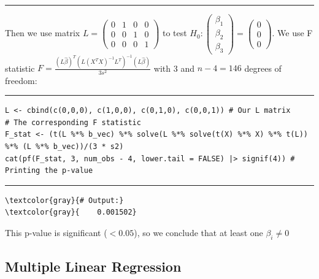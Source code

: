 \documentclass{article}
\begin{document}
\vspace{-15pt} %
\par\noindent\rule{\textwidth}{0.4pt}
Then we use matrix $L = \begin{pmatrix}
    0 & 1 & 0 & 0 \\
    0 & 0 & 1 & 0 \\
    0 & 0 & 0 & 1 
\end{pmatrix}$ to test $H_0: \begin{pmatrix}
    \beta_1 \\ \beta_2 \\ \beta_3
\end{pmatrix} = \begin{pmatrix}
    0 \\ 0 \\ 0
\end{pmatrix}$. We use F statistic $F = \frac{(L\hat{\beta})^T(L(X^TX)^{-1}L^T)^{-1}(L\hat{\beta})}{3s^2}$ with 3 and $n-4 = 146$ degrees of freedom:
\newpage
\par\noindent\rule{\textwidth}{0.4pt}
\vspace{-25pt} %
\begin{verbatim}
L <- cbind(c(0,0,0), c(1,0,0), c(0,1,0), c(0,0,1)) # Our L matrix
# The corresponding F statistic
F_stat <- (t(L %*% b_vec) %*% solve(L %*% solve(t(X) %*% X) %*% t(L)) %*% (L %*% b_vec))/(3 * s2)
cat(pf(F_stat, 3, num_obs - 4, lower.tail = FALSE) |> signif(4)) # Printing the p-value
\end{verbatim}

\vspace{-15pt} %
\par\noindent\rule{\textwidth}{0.4pt}
\begin{Verbatim}[commandchars=\\\{\}]
\textcolor{gray}{# Output:}
\textcolor{gray}{    0.001502}
\end{Verbatim}
This p-value is significant ($<0.05$), so we conclude that at least one $\beta _i \ne 0$
\subsection{Multiple Linear Regression}
\end{document}
